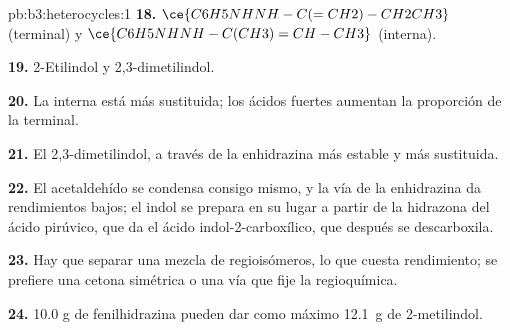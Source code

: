 \begin{solution}{pb:b3:heterocycles:1}
\textbf{18.} $\ce{C6H5NHNH-C(=CH2)-CH2CH3}$ (terminal) y $\ce{C6H5NHNH-C(CH3)=CH-CH3}$ (interna).

\textbf{19.} 2-Etilindol y 2,3-dimetilindol.

\textbf{20.} La interna está más sustituida; los ácidos fuertes aumentan la proporción de la
terminal.

\textbf{21.} El 2,3-dimetilindol, a través de la enhidrazina más estable y más
sustituida.

\textbf{22.} El acetaldehído se condensa consigo mismo, y la vía de la enhidrazina da rendimientos
bajos; el indol se prepara en su lugar a partir de la hidrazona del ácido pirúvico, que da el
ácido indol-2-carboxílico, que después se descarboxila.

\textbf{23.} Hay que separar una mezcla de regioisómeros, lo que cuesta rendimiento; se prefiere una
cetona simétrica o una vía que fije la regioquímica.

\textbf{24.} 10.0 g de fenilhidrazina pueden dar como máximo \qty{12.1}{g} de 2-metilindol.
\end{solution}
